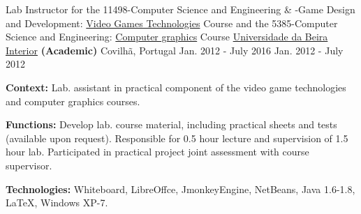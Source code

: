 \begin{cventries}
  \cventry
    {Lab Instructor for the
        11498-Computer Science and Engineering \& -Game Design and Development: 
		\href{http://www.di.ubi.pt/~agomes/tjv/}{Video Games Technologies}	Course 
		\linebreak and the
		5385-Computer Science and Engineering: 		
		\href{http://www.di.ubi.pt/~agomes/cg/}{Computer graphics} Course} %
    {\href{http://www.ubi.pt}{Universidade da Beira Interior} \textbf{(Academic)}} %
    {Covilh\~a, Portugal} %
    {\linebreak Jan. 2012 - July 2016 \linebreak Jan. 2012 - July 2012} %
    {
      \begin{cvitems} %
		\item[] {\textbf{Context:} Lab. assistant in practical component of the video game technologies and computer graphics courses.}
		\item[] {\textbf{Functions:} Develop lab. course material, including practical sheets and tests (available upon request). Responsible for 0.5 hour lecture and supervision of 1.5 hour lab. Participated in practical project joint assessment with course supervisor.}
		\item[] {\textbf{Technologies:} \textcolor{rainbowcolor-olive}{Whiteboard}, \textcolor{rainbowcolor-olive}{LibreOffce}, \textcolor{rainbowcolor-olive}{JmonkeyEngine}, \textcolor{rainbowcolor-olive}{NetBeans}, \textcolor{rainbowcolor-indigo}{Java 1.6-1.8}, \textcolor{rainbowcolor-indigo}{LaTeX}, %
\textcolor{rainbowcolor-orange}{Windows XP-7}.}
      \end{cvitems}
    }       
    

\end{cventries}
